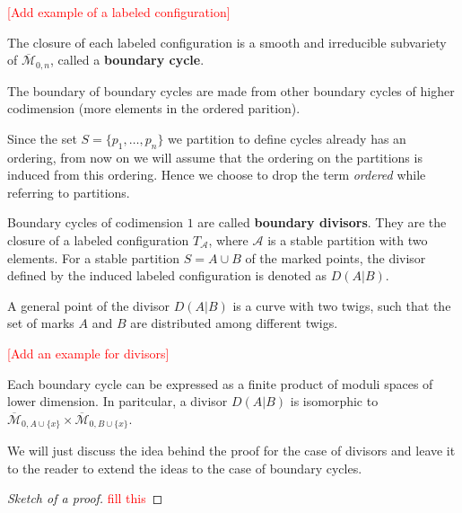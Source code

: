 \begin{example}
    \textcolor{red}{[Add example of a labeled configuration]}
\end{example}

\begin{definition}
    The closure of each labeled configuration is a smooth and irreducible subvariety of $\overline{\mathcal{M}}_{0,n}$, called a \textbf{boundary cycle}.
    \par The boundary of boundary cycles are made from other boundary cycles of higher codimension (more elements in the ordered parition).
\end{definition}

\begin{remark}
    Since the set $S = \{p_{1}, \dots, p_{n}\}$ we partition to define cycles already has an ordering, from now on we will assume that the ordering on the partitions is induced from this ordering. Hence we choose to drop the term \textit{ordered} while referring to partitions.
\end{remark}

\begin{definition}
    Boundary cycles of codimension $1$ are called \textbf{boundary divisors}. 
    They are the closure of a labeled configuration $T_{\mathcal{A}}$, where $\mathcal{A}$ is a stable partition with two elements.
    For a stable partition $S = A \cup B$ of the marked points, the divisor defined by the induced labeled configuration is denoted as $D(A|B)$.
    \par A general point of the divisor $D(A|B)$ is a curve with two twigs, such that the set of marks $A$ and $B$ are distributed among different twigs.
\end{definition}

\begin{example}
    \textcolor{red}{[Add an example for divisors]}
\end{example}

\begin{proposition}
    Each boundary cycle can be expressed as a finite product of moduli spaces of lower dimension. 
    In paritcular, a divisor $D(A|B)$ is isomorphic to $\overline{\mathcal{M}}_{0,A \cup \{x\}} \times \overline{\mathcal{M}}_{0,B \cup \{x\}}$.
\par We will just discuss the idea behind the proof for the case of divisors and leave it to the reader to extend the ideas to the case of boundary cycles.
\end{proposition}
\begin{proof}[Sketch of a proof]
    \textcolor{red}{fill this}
\end{proof}

